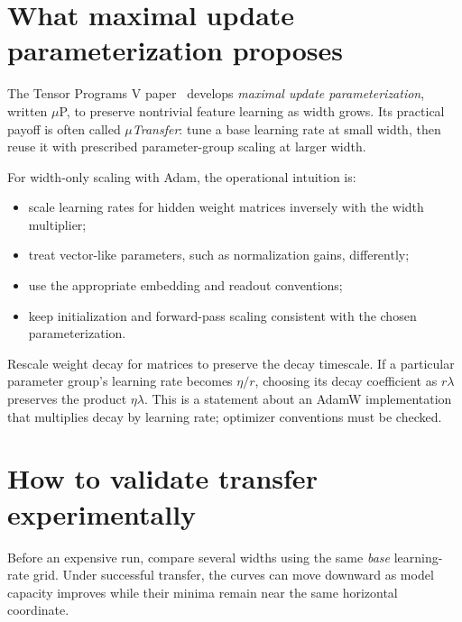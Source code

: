 \section{What maximal update parameterization proposes}
The Tensor Programs V paper~\cite{mup} develops \emph{maximal update parameterization}, written $\mu$P, to preserve nontrivial feature learning as width grows. Its practical payoff is often called \emph{$\mu$Transfer}: tune a base learning rate at small width, then reuse it with prescribed parameter-group scaling at larger width.

For width-only scaling with Adam, the operational intuition is:
\begin{itemize}
\item scale learning rates for hidden weight matrices inversely with the width multiplier;
\item treat vector-like parameters, such as normalization gains, differently;
\item use the appropriate embedding and readout conventions;
\item keep initialization and forward-pass scaling consistent with the chosen parameterization.
\end{itemize}
Rescale weight decay for matrices to preserve the decay timescale. If a particular parameter group's learning rate becomes $\eta/r$, choosing its decay coefficient as $r\lambda$ preserves the product $\eta\lambda$. This is a statement about an AdamW implementation that multiplies decay by learning rate; optimizer conventions must be checked.



\section{How to validate transfer experimentally}
Before an expensive run, compare several widths using the same \emph{base} learning-rate grid. Under successful transfer, the curves can move downward as model capacity improves while their minima remain near the same horizontal coordinate.

